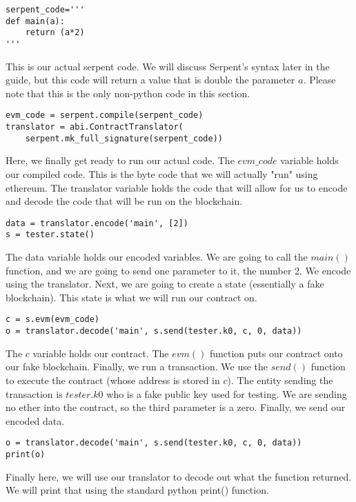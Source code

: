 \documentclass[12pt]{article}
\begin{document}
\begin{lstlisting}
serpent_code='''
def main(a):
	return (a*2)
'''
\end{lstlisting}

This is our actual serpent code. We will discuss Serpent's syntax later in the guide, but this code will return a value that is double the parameter $a$. Please note that this is the only non-python code in this section.

\begin{lstlisting}
evm_code = serpent.compile(serpent_code)
translator = abi.ContractTranslator(
	serpent.mk_full_signature(serpent_code))
\end{lstlisting}

Here, we finally get ready to run our actual code. The $evm\_code$ variable holds our compiled code. This is the byte code that we will actually "run" using ethereum. The translator variable holds the code that will allow for us to encode and decode the code that will be run on the blockchain.

\begin{lstlisting}
data = translator.encode('main', [2])
s = tester.state()
\end{lstlisting}

The data variable holds our encoded variables. We are going to call the $main()$ function, and we are going to send one parameter to it, the number 2. We encode using the translator. Next, we are going to create a state (essentially a fake blockchain). This state is what we will run our contract on. 

\begin{lstlisting}
c = s.evm(evm_code)
o = translator.decode('main', s.send(tester.k0, c, 0, data))
\end{lstlisting}

The $c$ variable holds our contract. The $evm()$ function puts our contract onto our fake blockchain. Finally, we run a transaction. We use the $send()$ function to execute the contract (whose address is stored in $c$). The entity sending the transaction is $tester.k0$ who is a fake public key used for testing. We are sending no ether into the contract, so the third parameter is a zero. Finally, we send our encoded data.

\begin{lstlisting}
o = translator.decode('main', s.send(tester.k0, c, 0, data))
print(o)
\end{lstlisting}

Finally here, we will use our translator to decode out what the function returned. We will print that using the standard python print() function.
\end{document}
